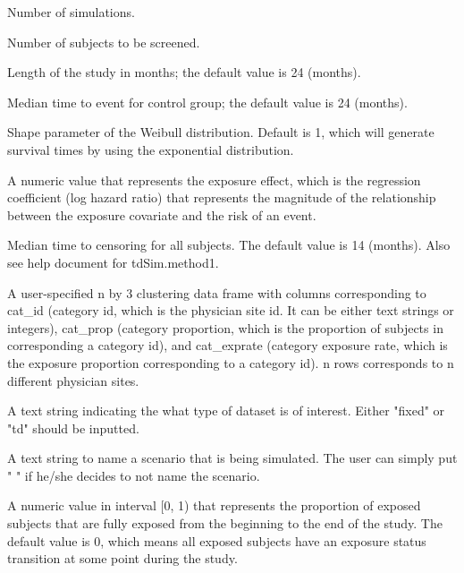 \documentclass[a4paper]{book}
\begin{document}
%
\begin{Arguments}
\begin{ldescription}
\item[\code{nSim}] 
Number of simulations.

\item[\code{N}] 
Number of subjects to be screened.

\item[\code{duration}] 
Length of the study in months; the default value is 24 (months).

\item[\code{med.TTE.Control}] 
Median time to event for control group; the default value is 24 (months).

\item[\code{rho}] 
Shape parameter of the Weibull distribution. Default is 1, which will generate survival times by using the exponential distribution.

\item[\code{beta}] 
A numeric value that represents the exposure effect, which is the regression coefficient (log hazard ratio) that represents the magnitude of the relationship between the exposure covariate and the risk of an event. 

\item[\code{med.TimeToCensor}] 
Median time to censoring for all subjects. The default value is 14 (months). Also see help document for tdSim.method1.

\item[\code{df}] 
A user-specified n by 3 clustering data frame with columns corresponding to cat\_id (category id, which is the physician site id. It can be either text strings or integers), cat\_prop (category proportion, which is the proportion of subjects in corresponding a category id), and cat\_exprate (category exposure rate, which is the exposure proportion corresponding to a category id). n rows corresponds to n different physician sites.

\item[\code{type}] 
A text string indicating the what type of dataset is of interest. Either "fixed" or "td" should be inputted.

\item[\code{scenario}] 
A text string to name a scenario that is being simulated. The user can simply put " " if he/she decides to not name the scenario.

\item[\code{prop.fullexp}] 
A numeric value in interval [0, 1) that represents the proportion of exposed subjects that are fully exposed from the beginning to the end of the study. The default value is 0, which means all exposed subjects have an exposure status transition at some point during the study.


\end{ldescription}
\end{Arguments}
\end{document}
